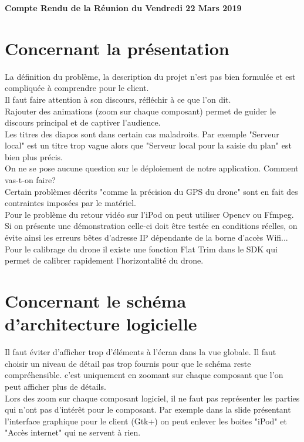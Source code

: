 \documentclass[]{article}
\begin{document}
\pagestyle{fancy}
\renewcommand\headrulewidth{1pt}
\renewcommand\footrulewidth{1pt}

\begin{center}
\large{\textbf{Compte Rendu de la Réunion du Vendredi 22 Mars 2019 \bigbreak}}
\end{center}

\section{Concernant la présentation}
La définition du problème, la description du projet n'est pas bien formulée et est compliquée à comprendre pour le client.\\
Il faut faire attention à son discours, réfléchir à ce que l'on dit.\\
Rajouter des animations (zoom sur chaque composant) permet de guider le discours principal et de captiver l'audience.\\
Les titres des diapos sont dans certain cas maladroits. Par exemple "Serveur local" est un titre trop vague alors que "Serveur local pour la saisie du plan" est bien plus précis.\\
On ne se pose aucune question sur le déploiement de notre application. Comment vas-t-on faire?\\
Certain problèmes décrits "comme la précision du GPS du drone" sont en fait des contraintes imposées par le matériel.\\
Pour le problème du retour vidéo sur l'iPod on peut utiliser Opencv ou Ffmpeg.\\Si on présente une démonstration celle-ci doit être testée en conditions réelles, on évite ainsi les erreurs bêtes d'adresse IP dépendante de la borne d'accès Wifi...\\
Pour le calibrage du drone il existe une fonction Flat Trim dans le SDK qui permet de calibrer rapidement l'horizontalité du drone.

 
\section{Concernant le schéma d'architecture logicielle}
Il faut éviter d'afficher trop d'éléments à l'écran dans la vue globale. Il faut choisir un niveau de détail pas trop fournis pour que le schéma reste compréhensible. c'est uniquement en zoomant sur chaque composant que l'on peut afficher plus de détails.\\
Lors des zoom sur chaque composant logiciel, il ne faut pas représenter les parties qui n'ont pas d'intérêt pour le composant. Par exemple dans la slide présentant l'interface graphique pour le client (Gtk+) on peut enlever les boites "iPod" et "Accès internet" qui ne servent à rien.
\end{document}
